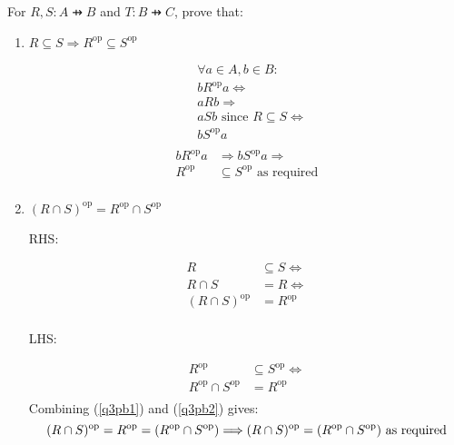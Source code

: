 \documentclass[10pt,\jkfside,a4paper]{article}
\begin{document}
\begin{enumerate}
For $R, S: A \pfun B$ and $T: B \pfun C$, prove that:

\begin{enumerate}

\item $R \subseteq S \Longrightarrow R^{\text{op}} \subseteq S^{\text{op}}$

\begin{equation}
\begin{split}
&\forall a \in A, b \in B:\\
&b R^{\text{op}} a \Longleftrightarrow\\
&a R b \Longrightarrow\\
&a S b \text{ since } R \subseteq S \Longleftrightarrow\\
&b S^{\text{op}} a\\
\end{split}
\end{equation}
\begin{equation}
\begin{split}
b R^{\text{op}} a &\Longrightarrow b S^{\text{op}} a \Longrightarrow \\
R^{\text{op}} &\subseteq S^{\text{op}} \text{ as required}\\
\end{split}
\end{equation}

\item $(R \cap S)^{\text{op}} = R^{\text{op}} \cap S^{\text{op}}$

\begin{center}
RHS:
\end{center}
\begin{equation}\label{q3pb1}
\begin{split}
R &\subseteq S \Longleftrightarrow \\
R \cap S &= R \Longleftrightarrow \\
(R \cap S)^{\text{op}} &= R^{\text{op}} \\
\end{split}
\end{equation}
\begin{center}
LHS:
\end{center}
\begin{equation}\label{q3pb2}
\begin{split}
R^{\text{op}} &\subseteq S^{\text{op}} \Longleftrightarrow \\
R^{\text{op}} \cap S^{\text{op}} &= R^{\text{op}} \\
\end{split}
\end{equation}
Combining (\ref{q3pb1}) and (\ref{q3pb2}) gives:
\begin{equation}
(R \cap S)^{\text{op}} = R^{\text{op}} = (R^{\text{op}} \cap S^{\text{op}}) \Longrightarrow \\
(R \cap S)^{\text{op}} = (R^{\text{op}} \cap S^{\text{op}}) \text{ as required}\\
\end{equation}


\end{enumerate}
\end{enumerate}
\end{document}
